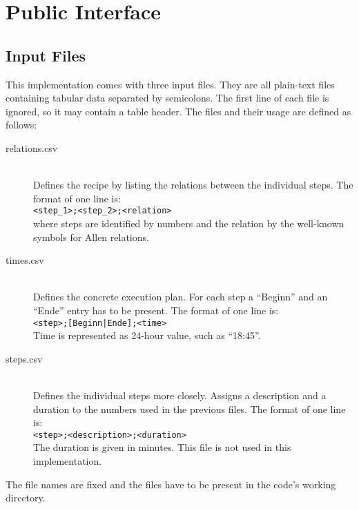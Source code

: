 \chapter{Public Interface}

  \section{Input Files}
    
    This implementation comes with three input files. They are all plain-text
    files containing tabular data separated by semicolons. The first line of
    each file is ignored, so it may contain a table header. The files and their
    usage are defined as follows:
    
    \begin{description}
        \item[relations.csv] \hfill \\
            Defines the recipe by listing the relations between the individual
            steps. The format of one line is:\\
            \texttt{<step\_1>;<step\_2>;<relation>}\\
            where steps are identified by numbers and the relation by the
            well-known symbols for Allen relations.
        \item[times.csv] \hfill \\
            Defines the concrete execution plan. For each step a ``Beginn'' and
            an ``Ende'' entry has to be present. The format of one line is:\\
            \texttt{<step>;[Beginn|Ende];<time>}\\
            Time is represented as 24-hour value, such as ``18:45''.
        \item[steps.csv] \hfill \\
            Defines the individual steps more closely. Assigns a description and
            a duration to the numbers used in the previous files. The format of
            one line is:\\
            \texttt{<step>;<description>;<duration>}\\
            The duration is given in minutes. This file is not used in this
            implementation.
    \end{description}
    
    The file names are fixed and the files have to be present in the code's
    working directory.
      
